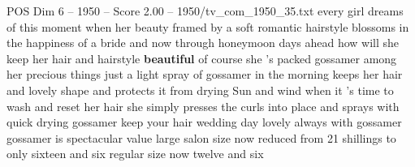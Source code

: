 \begin{textsample}{POS Dim 6 – 1950 – Score 2.00 – 1950/tv\_com\_1950\_35.txt}  \label{ex:f6_pos_011}
every girl dreams of this moment when her beauty framed by a soft romantic hairstyle blossoms in the happiness of a bride and now through honeymoon days ahead how will she keep her hair and hairstyle \textbf{beautiful} of course she 's packed gossamer among her precious things just a light spray of gossamer in the morning keeps her hair and lovely shape and protects it from drying Sun and wind when it 's time to wash and reset her hair she simply presses the curls into place and sprays with quick drying gossamer keep your hair wedding day lovely always with gossamer gossamer is spectacular value large salon size now reduced from 21 shillings to only sixteen and six regular size now twelve and six

\end{textsample}
